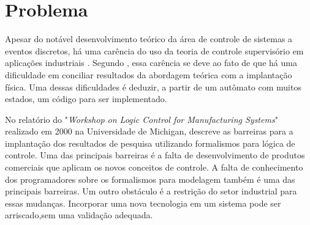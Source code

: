 





\section{Problema}



Apesar do not\'avel desenvolvimento te\'orico da \'area de controle de sistemas a eventos discretos, h\'a uma car\^encia do uso da teoria de controle supervis\'orio em aplica\c{c}\~oes industriais \cite{queiroz2002}. Segundo \cite{fabian}, essa car\^encia se deve ao fato de que h\'a uma dificuldade em conciliar resultados da abordagem te\'orica com a implanta\c{c}\~ao f\'isica. Uma dessas dificuldades \'e deduzir, a partir de um aut\^omato com muitos estados, um c\'odigo para ser implementado.

No relat\'orio do "\textit{Workshop on Logic Control for Manufacturing Systems}" \space realizado em 2000 na Universidade de Michigan, \cite{workshop2000} descreve as barreiras para a implanta\c{c}\~ao dos resultados de pesquisa utilizando formalismos para l\'ogica de controle. Uma das principais barreiras \'e a falta de desenvolvimento de produtos comerciais que aplicam os novos conceitos de controle. A falta de conhecimento dos programadores sobre os formalismos para modelagem tamb\'em \'e uma das principais barreiras. Um outro obst\'aculo \'e a restri\c{c}\~ao do setor industrial para essas mudan\c{c}as. Incorporar uma nova tecnologia em um sistema pode ser arriscado,sem uma valida\c{c}\~ao adequada.

